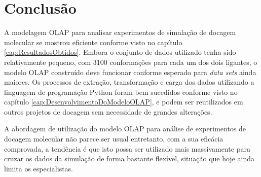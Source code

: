 \chapter{Conclusão}

A modelagem OLAP para analisar experimentos de simulação de docagem molecular se mostrou eficiente conforme visto no capítulo \ref{cap:ResultadosObtidos}. Embora o conjunto de dados utilizado tenha sido relativamente pequeno, com 3100 conformações para cada um dos dois ligantes, o modelo OLAP construído deve funcionar conforme esperado para \emph{data sets} ainda maiores. Os processos de extração, transformação e carga dos dados utilizando a linguagem de programação Python foram bem sucedidos conforme visto no capítulo \ref{cap:DesenvolvimentoDoModeloOLAP}, e podem ser reutilizados em outros projetos de docagem sem necessidade de grandes alterações. 

A abordagem de utilização do modelo OLAP para análise de experimentos de docagem molecular não parece ser usual entretanto, com a sua eficácia comprovada, a tendência é que isto possa ser utilizado mais massivamente para cruzar os dados da simulação de forma bastante flexível, situação que hoje ainda limita os especialistas.
